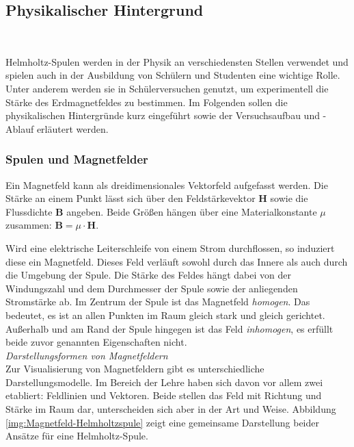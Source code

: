 \subsection{Physikalischer Hintergrund}
\label{sec-2-2}
\begin{center}
	\\
\end{center}


Helmholtz-Spulen werden in der Physik an verschiedensten Stellen verwendet und spielen auch in der Ausbildung von Schülern und Studenten eine wichtige Rolle. Unter anderem werden sie in Schülerversuchen genutzt, um experimentell die Stärke des Erdmagnetfeldes zu bestimmen. Im Folgenden sollen die physikalischen Hintergründe kurz eingeführt sowie der Versuchsaufbau und -Ablauf erläutert werden.

\subsubsection{Spulen und Magnetfelder}
\label{sec-2-2-1}
Ein Magnetfeld kann als dreidimensionales Vektorfeld aufgefasst werden. Die Stärke an einem Punkt lässt sich über den Feldstärkevektor $\boldsymbol{H}$ sowie die Flussdichte $\boldsymbol{B}$ angeben. Beide Größen hängen über eine Materialkonstante $\mu$ zusammen: $\boldsymbol{B} = \mu \cdot \boldsymbol{H}$.
\par
\noindent\hspace*{5mm}
Wird eine elektrische Leiterschleife von einem Strom durchflossen, so induziert diese ein Magnetfeld. Dieses Feld verläuft sowohl durch das Innere als auch durch die Umgebung der Spule. Die Stärke des Feldes hängt dabei von der Windungszahl und dem Durchmesser der Spule sowie der anliegenden Stromstärke ab.
Im Zentrum der Spule ist das Magnetfeld \textit{homogen}. Das bedeutet, es ist an allen Punkten im Raum gleich stark und gleich gerichtet. Außerhalb und am Rand der Spule hingegen ist das Feld \textit{inhomogen}, es erfüllt beide zuvor genannten Eigenschaften nicht.\\

\textit{Darstellungsformen von Magnetfeldern}\\
Zur Visualisierung von Magnetfeldern gibt es unterschiedliche Darstellungsmodelle. Im Bereich der Lehre haben sich davon vor allem zwei etabliert: Feldlinien und Vektoren. Beide stellen das Feld mit Richtung und Stärke im Raum dar, unterscheiden sich aber in der Art und Weise. Abbildung \ref{img:Magnetfeld-Helmholtzspule} zeigt eine gemeinsame Darstellung beider Ansätze für eine Helmholtz-Spule.\\

